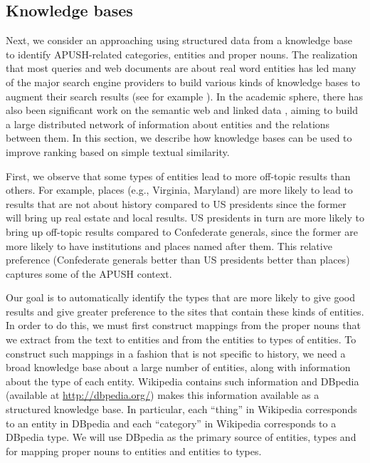 \documentclass[pdfpagelabels=false,plainpages=true]{acm_proc_article-sp}
\begin{document}
\subsection{Knowledge bases}

Next, we consider an approaching using
structured data from a knowledge base to identify APUSH-related categories,
entities and proper nouns. The realization that most queries and web documents
are about real word entities 
has led  many of the major search engine providers to build various kinds of knowledge
bases to augment their search results (see for example \cite{googlekg}). In the
academic sphere, there has also been significant work on the semantic
web \cite{berners2001semantic} and linked data \cite{bizer2008linked}, aiming to build a
large distributed network of information about entities and the relations
between them. In this section, we describe how knowledge bases can be
used to improve ranking based on simple textual similarity.  

First, we observe that some types of entities lead to more off-topic results than
others. For example, places (e.g., Virginia, Maryland) are more likely to lead
to results that are not about history compared to US presidents since the former
will bring up real estate and local results. US presidents in turn are more
likely to bring up off-topic results compared to Confederate generals, since the
former are more likely to have institutions and places named after them. This
relative preference (Confederate generals better than US presidents better than
places) captures some of the APUSH context. 

Our goal is to automatically identify the types that are more likely to give
good results and give greater preference to the sites that contain these kinds
of entities. In order to do this, we must first construct mappings from the proper nouns that
we extract from the text to entities and from the entities to types of
entities. To construct such mappings in a fashion that is not specific to history, we need a
broad knowledge base about a large number of entities, along with information
about the type of each entity. Wikipedia contains such information and DBpedia
(available at \url{http://dbpedia.org/}) makes this information available as a
structured knowledge base. In particular, each ``thing'' in Wikipedia
corresponds to an entity in DBpedia and each ``category'' in Wikipedia
corresponds to a DBpedia type. We will use DBpedia as the primary source of
entities, types and for mapping proper nouns to entities and entities to types. 
\end{document}
